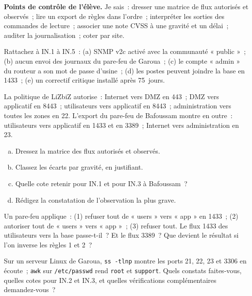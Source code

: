\begin{boxinfo}
\textbf{Points de contrôle de l'élève.} Je sais~: dresser une matrice de
flux autorisés et observés~; lire un export de règles dans l'ordre~;
interpréter les sorties des commandes de lecture~; associer une note CVSS
à une gravité et un délai~; auditer la journalisation~; coter par site.
\end{boxinfo}

\bigskip

\begin{boxexo}[title={\ding{45}\quad Exercice~21.1. Rattacher \niveaubase}]
Rattachez à IN.1 à IN.5~: (a) SNMP v2c activé avec la communauté
« public »~; (b) aucun envoi des journaux du pare-feu de Garoua~; (c) le
compte « admin » du routeur a son mot de passe d'usine~; (d) les postes
peuvent joindre la base en 1433~; (e) un correctif critique installé après
75~jours.
\end{boxexo}

\begin{boxexo}[title={\ding{45}\quad Exercice~21.2. Matrice de flux \niveaumoyen}]
La politique de LiZbiZ autorise~: Internet vers DMZ en 443~; DMZ vers
applicatif en 8443~; utilisateurs vers applicatif en 8443~; administration
vers toutes les zones en 22. L'export du pare-feu de Bafoussam montre en
outre~: utilisateurs vers applicatif en 1433 et en 3389~; Internet vers
administration en 23.
\begin{enumerate}[(a)]
    \item Dressez la matrice des flux autorisés et observés.
    \item Classez les écarts par gravité, en justifiant.
    \item Quelle cote retenir pour IN.1 et pour IN.3 à Bafoussam~?
    \item Rédigez la constatation de l'observation la plus grave.
\end{enumerate}
\end{boxexo}

\begin{boxexo}[title={\ding{45}\quad Exercice~21.3. L'ordre des règles \niveaumoyen}]
Un pare-feu applique~: (1) refuser tout de « users » vers « app » en 1433~;
(2) autoriser tout de « users » vers « app »~; (3) refuser tout. Le flux
1433 des utilisateurs vers la base passe-t-il~? Et le flux 3389~? Que
devient le résultat si l'on inverse les règles 1 et 2~?
\end{boxexo}

\begin{boxexo}[title={\ding{45}\quad Exercice~21.4. Interpréter des sorties \niveaumoyen}]
Sur un serveur Linux de Garoua, \texttt{ss -tlnp} montre les ports 21, 22,
23 et 3306 en écoute~; \texttt{awk} sur \texttt{/etc/passwd} rend
\texttt{root} et \texttt{support}. Quels constats faites-vous, quelles cotes
pour IN.2 et IN.3, et quelles vérifications complémentaires demandez-vous~?
\end{boxexo}

